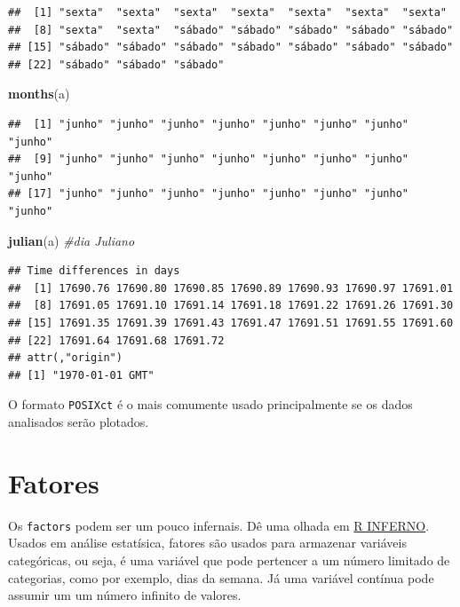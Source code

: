 \documentclass[]{book}
\newenvironment{Shaded}{\begin{snugshade}}{\end{snugshade}}
\newcommand{\KeywordTok}[1]{\textcolor[rgb]{0.13,0.29,0.53}{\textbf{#1}}}
\newcommand{\CommentTok}[1]{\textcolor[rgb]{0.56,0.35,0.01}{\textit{#1}}}
\newcommand{\NormalTok}[1]{#1}
\theoremstyle{definition}
\theoremstyle{definition}
\theoremstyle{definition}
\theoremstyle{remark}
\begin{document}
\begin{verbatim}
##  [1] "sexta"  "sexta"  "sexta"  "sexta"  "sexta"  "sexta"  "sexta" 
##  [8] "sexta"  "sexta"  "sábado" "sábado" "sábado" "sábado" "sábado"
## [15] "sábado" "sábado" "sábado" "sábado" "sábado" "sábado" "sábado"
## [22] "sábado" "sábado" "sábado"
\end{verbatim}

\begin{Shaded}
\begin{Highlighting}[]
\KeywordTok{months}\NormalTok{(a)}
\end{Highlighting}
\end{Shaded}

\begin{verbatim}
##  [1] "junho" "junho" "junho" "junho" "junho" "junho" "junho" "junho"
##  [9] "junho" "junho" "junho" "junho" "junho" "junho" "junho" "junho"
## [17] "junho" "junho" "junho" "junho" "junho" "junho" "junho" "junho"
\end{verbatim}

\begin{Shaded}
\begin{Highlighting}[]
\KeywordTok{julian}\NormalTok{(a) }\CommentTok{#dia Juliano}
\end{Highlighting}
\end{Shaded}

\begin{verbatim}
## Time differences in days
##  [1] 17690.76 17690.80 17690.85 17690.89 17690.93 17690.97 17691.01
##  [8] 17691.05 17691.10 17691.14 17691.18 17691.22 17691.26 17691.30
## [15] 17691.35 17691.39 17691.43 17691.47 17691.51 17691.55 17691.60
## [22] 17691.64 17691.68 17691.72
## attr(,"origin")
## [1] "1970-01-01 GMT"
\end{verbatim}

O formato \texttt{POSIXct} é o mais comumente usado principalmente se os
dados analisados serão plotados.

\section{Fatores}\label{fatores}

Os \texttt{factors} podem ser um pouco infernais. Dê uma olhada em
\href{http://www.burns-stat.com/documents/books/the-r-inferno/}{R
INFERNO}.\\
Usados em análise estatísica, fatores são usados para armazenar
variáveis categóricas, ou seja, é uma variável que pode pertencer a um
número limitado de categorias, como por exemplo, dias da semana. Já uma
variável contínua pode assumir um um número infinito de valores.
\end{document}
